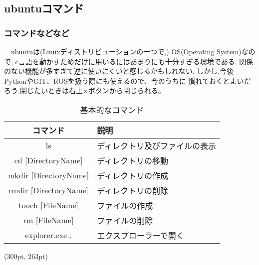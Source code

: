\documentclass[dvipdfmx]{beamer}
\begin{document}
\subsection{ubuntuコマンド}
\begin{frame}[t, fragile, label=6]
    \frametitle{コマンドなどなど}
    　ubuntuは(Linuxディストリビューションの一つで,)
    OS(Operating System)なので,
    c言語を動かすためだけに用いるにはあまりにも十分すぎる環境である.
    関係のない機能が多すぎて逆に使いにくいと感じるかもしれない.
    しかし,今後PythonやGIT、ROSを扱う際にも使えるので、今のうちに
    慣れておくとよいだろう.閉じたいときは右上×ボタンから閉じられる。
    \begin{table}[h]
        \caption{基本的なコマンド}
        \label{commands}
        \centering
        \vspace{-5pt}
        \begin{tabular}{cl}
            \hline
            コマンド & 説明\\               
            \hline \hline
            ls & ディレクトリ及びファイルの表示\\
            cd [DirectoryName] & ディレクトリの移動\\
            mkdir [DirectoryName] & ディレクトリの作成\\
            rmdir [DirectoryName] & ディレクトリの削除\\
            touch [FileName] & ファイルの作成\\
            rm [FileName] & ファイルの削除\\
            explorer.exe . & エクスプローラーで開く\\
            \hline
        \end{tabular}
    \end{table}
    \begin{textblock*}{0.3\linewidth}(300pt, 263pt)
    \hyperlink{5}{}
    \space
    \hyperlink{7}{}
    \end{textblock*}
\end{frame}
\end{document}

